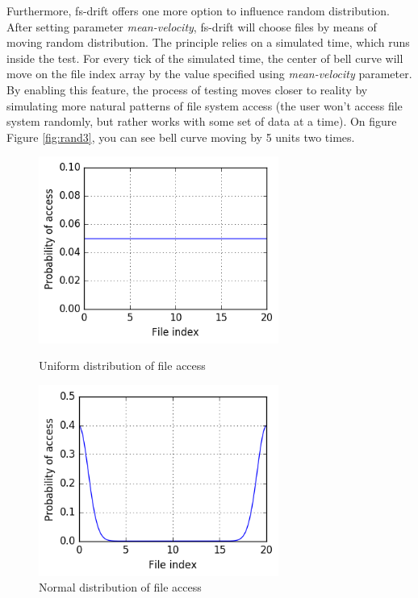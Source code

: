 \documentclass[
  color, %
  table, %
  lof,   %
  lot,   %
]{fithesis3}
\begin{document}
Furthermore, fs-drift offers one more option to influence random distribution. After setting parameter \textit{mean-velocity}, fs-drift will choose files by means of moving random distribution. The principle relies on a simulated time, which runs inside the test. For every tick of the simulated time, the center of bell curve will move on the file index array by the value specified using \textit{mean-velocity} parameter. By enabling this feature, the process of testing moves closer to reality by simulating more natural patterns of file system access (the user won't access file system randomly, but rather works with some set of data at a time). On figure Figure \ref{fig:rand3}, you can see bell curve moving by 5 units two times.

\begin{figure}
    \centering
    \begin{minipage}{\textwidth}
        \centering
        \includegraphics[width=0.7\textwidth]{../scripts/fig1.png}
        \caption{Uniform distribution of file access}
\label{fig:rand1}
    \end{minipage}\hfill
    \begin{minipage}{\textwidth}
        \centering
        \includegraphics[width=0.7\textwidth]{../scripts/fig2.png}
        \caption{Normal distribution of file access}

\label{fig:rand2}
    \end{minipage}

\end{figure}
\end{document}
